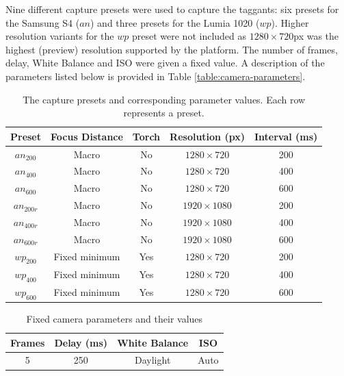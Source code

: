 \documentclass[thesis.tex]{subfiles}
\begin{document}
Nine different capture presets were used to capture the taggants: six presets for the Samsung S4 ($an$) and three presets for the Lumia 1020 ($wp$). Higher resolution variants for the $wp$ preset were not included as $1280\times720$px was the highest (preview) resolution supported by the platform. The number of frames, delay, White Balance and ISO were given a fixed value. A description of the parameters listed below is provided in Table \ref{table:camera-parameters}.

\begin{table}[ht]
  \caption{The capture presets and corresponding parameter values. Each row represents a preset.}
  \label{table:capture-presets}
  \vspace{-6mm}
  \begin{center}
  \begin{tabular}{| c | c | c | c | c |}
    \hline
    \textbf{Preset} & \textbf{Focus Distance} & \textbf{Torch} & \textbf{Resolution (px)} & \textbf{Interval (ms)} \\ \hline
    $an_{200}$ & Macro & No & $1280\times720$ & 200 \\
    \hline
    $an_{400}$ & Macro & No & $1280\times720$ & 400 \\
    \hline
    $an_{600}$ & Macro & No & $1280\times720$ & 600 \\
    \hline
    $an_{200r}$ & Macro & No & $1920\times1080$ & 200 \\
    \hline
    $an_{400r}$ & Macro & No & $1920\times1080$ & 400 \\
    \hline
    $an_{600r}$ & Macro & No & $1920\times1080$ & 600 \\
    \hline
    $wp_{200}$ & Fixed minimum & Yes & $1280\times720$ & 200 \\
    \hline
    $wp_{400}$ & Fixed minimum & Yes & $1280\times720$ & 400 \\
    \hline
    $wp_{600}$ & Fixed minimum & Yes & $1280\times720$ & 600 \\
    \hline
  \end{tabular}
  \end{center}
\end{table}
\vspace{-4mm}
\begin{table}[ht]
  \caption{Fixed camera parameters and their values}
  \label{table:capture-presets-fixed}
  \vspace{-2mm}
  \begin{center}
  \begin{tabular}{| c | c | c | c |}
    \hline
    \textbf{Frames}  & \textbf{Delay (ms)} & \textbf{White Balance} & \textbf{ISO} \\ \hline
    5 & 250 & Daylight & Auto \\
    \hline
  \end{tabular}
  \end{center}
\end{table}
\end{document}
